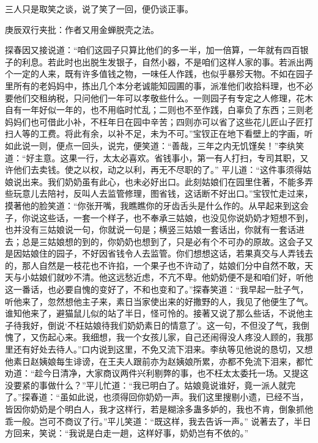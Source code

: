 \begin{parag}


    三人只是取笑之谈，说了笑了一回，便仍谈正事。\begin{note}庚辰双行夹批：作者又用金蝉脱壳之法。\end{note}探春因又接说道：“咱们这园子只算比他们的多一半，加一倍算，一年就有四百银子的利息。若此时也出脱生发银子，自然小器，不是咱们这样人家的事。若派出两个一定的人来，既有许多值钱之物，一味任人作践，也似乎暴殄天物。不如在园子里所有的老妈妈中，拣出几个本分老诚能知园圃的事，派准他们收拾料理，也不必要他们交租纳税，只问他们一年可以孝敬些什么。一则园子有专定之人修理，花木自有一年好似一年的，也不用临时忙乱；二则也不至作践，白辜负了东西；三则老妈妈们也可借此小补，不枉年日在园中辛苦；四则亦可以省了这些花儿匠山子匠打扫人等的工费。将此有余，以补不足，未为不可。”宝钗正在地下看壁上的字画，听如此说一则，便点一回头，说完，便笑道：“善哉，三年之内无饥馑矣！”李纨笑道：“好主意。这果一行，太太必喜欢。省钱事小，第一有人打扫，专司其职，又许他们去卖钱。使之以权，动之以利，再无不尽职的了。” 平儿道：“这件事须得姑娘说出来。我们奶奶虽有此心，也未必好出口。此刻姑娘们在园里住著，不能多弄些玩意儿去陪衬，反叫人去监管修理，图省钱，这话断不好出口。”宝钗忙走过来，摸著他的脸笑道：“你张开嘴，我瞧瞧你的牙齿舌头是什么作的。从早起来到这会子，你说这些话，一套一个样子，也不奉承三姑娘，也没见你说奶奶才短想不到，也并没有三姑娘说一句，你就说一句是；横竖三姑娘一套话出，你就有一套话进去；总是三姑娘想的到的，你奶奶也想到了，只是必有个不可办的原故。这会子又是因姑娘住的园子，不好因省钱令人去监管。你们想想这话，若果真交与人弄钱去的，那人自然是一枝花也不许掐，一个果子也不许动了，姑娘们分中自然不敢，天天与小姑娘们就吵不清。他这远愁近虑，不亢不卑。他奶奶便不是和咱们好，听他这一番话，也必要自愧的变好了，不和也变和了。”探春笑道：“我早起一肚子气，听他来了，忽然想他主子来，素日当家使出来的好撒野的人，我见了他便生了气。谁知他来了，避猫鼠儿似的站了半日，怪可怜的。接著又说了那么些话，不说他主子待我好，倒说‘不枉姑娘待我们奶奶素日的情意了’。这一句，不但没了气，我倒愧了，又伤起心来。我细想，我一个女孩儿家，自己还闹得没人疼没人顾的，我那里还有好处去待人。”口内说到这里，不免又流下泪来。李纨等见他说的恳切，又想他素日赵姨娘每生诽谤，在王夫人跟前亦为赵姨娘所累，亦都不免流下泪来，都忙劝道：“趁今日清净，大家商议两件兴利剔弊的事，也不枉太太委托一场。又提这没要紧的事做什么？”平儿忙道：“我已明白了。姑娘竟说谁好，竟一派人就完了。”探春道：“虽如此说，也须得回你奶奶一声。我们这里搜剔小遗，已经不当，皆因你奶奶是个明白人，我才这样行，若是糊涂多蛊多妒的，我也不肯，倒象抓他乖一般。岂可不商议了行。”平儿笑道：“既这样，我去告诉一声。” 说著去了，半日方回来，笑说：“我说是白走一趟，这样好事，奶奶岂有不依的。”
\end{parag}



